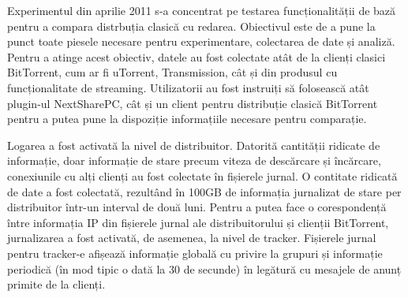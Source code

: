 Experimentul din aprilie 2011 s-a concentrat pe testarea funcționalității de
bază pentru a compara distrbuția clasică cu redarea. Obiectivul este de a
pune la punct toate piesele necesare pentru experimentare, colectarea de date
și analiză. Pentru a atinge acest obiectiv, datele au fost colectate atât de la
clienți clasici BitTorrent, cum ar fi uTorrent, Transmission, cât și din
produsul cu funcționalitate de streaming. Utilizatorii au fost instruiți să
folosească atât plugin-ul NextSharePC, cât și un client pentru distribuție
clasică BitTorrent pentru a putea pune la dispoziție informațiile necesare
pentru comparație.

Logarea a fost activată la nivel de distribuitor. Datorită cantității ridicate de
informație, doar informație de stare precum viteza de descărcare și încărcare,
conexiunile cu alți clienți au fost colectate în fișierele jurnal. O contitate
ridicată de date a fost colectată, rezultând în 100GB de informația jurnalizat de stare
per distribuitor într-un interval de două luni. Pentru a putea face o corespondență
între informația IP din fișierele jurnal ale distribuitorului și clienții BitTorrent,
jurnalizarea a fost activată, de asemenea, la nivel de tracker. Fișierele
jurnal pentru
tracker-e afișează informație globală cu privire la grupuri și informație periodică
(în mod tipic o dată la 30 de secunde) în legătură cu mesajele de anunț primite de
la clienți.

